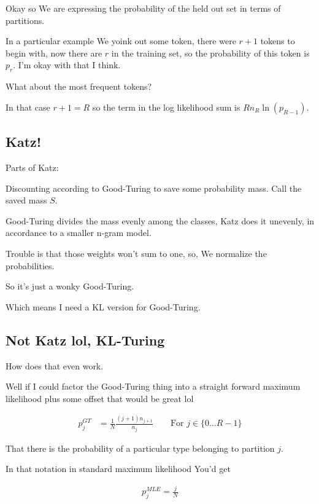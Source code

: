 \documentclass{article}
\begin{document}
			Okay so We are expressing the probability of the held out set in terms of partitions. 
			
			In a particular example We yoink out some token, there were $r+1$ tokens to begin with, now there are $r$ in the training set, so the probability of this token is $p_r$. I'm okay with that I think.
			
			What about the most frequent tokens?
			
			In that case $r+1=R$ so the term in the log likelihood sum is $Rn_R\ln(p_{R-1})$.
			
			
	\subsection{Katz!}
	
		Parts of Katz:
		
		Discounting according to Good-Turing to save some probability mass. Call the saved mass $S$.
		
		Good-Turing divides the mass evenly among the classes, Katz does it unevenly, in accordance to a smaller n-gram model.
		
		Trouble is that those weights won't sum to one, so, We normalize the probabilities.
		
		So it's just a wonky Good-Turing.
		
		Which means I need a KL version for Good-Turing. 
		
		
	\subsection{Not Katz lol, KL-Turing}
	
		How does that even work.
		
		Well if I could factor the Good-Turing thing into a straight forward maximum likelihood plus some offset that would be great lol
		
		\begin{align}
			p_j^{GT}  &= \frac{1}{N}\frac{(j+1)n_{j+1}}{n_j} \qquad \text{For }j\in\{0\ldots R-1\}
		\end{align}
		
		That there is the probability of a particular type belonging to partition $j$.
		
		In that notation in standard maximum likelihood You'd get
		
		\begin{align}
			p^{MLE}_j = \frac{j}{N}
		\end{align}
		
\end{document}
